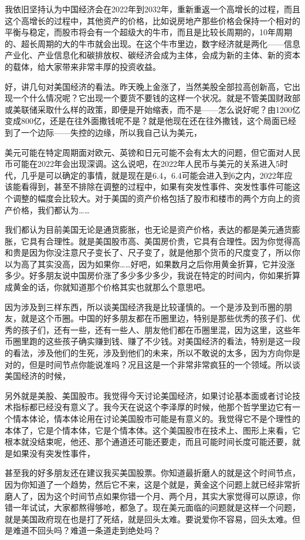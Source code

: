 \documentclass[UTF8, 12pt, a4paper]{ctexrep}
\begin{document}
我依旧坚持认为中国经济会在2022年到2032年，重新重返一个高增长的过程，而且这个高增长的过程中，其他资产的价格，比如说房地产那些价格会保持一个相对的平衡与稳定，而股市将会有一个超级大的牛市，而且是比较长周期的，10年周期的、超长周期的大的牛市就会出现。在这个牛市里边，数字经济就是两化——信息产业化、产业信息化和碳排放权、碳经济会成为主体，会成为新的主体、新的资本的载体，给大家带来非常丰厚的投资收益。

好，讲几句对美国经济的看法。昨天晚上金涨了，当然美股全部拉高创新高，它出现一个什么情况呢？它出现一个要货不要钱的这样一个状况。就是不管美国财政部或美联储采取什么样的政策，即便是开始缩表，而不是——怎么说好呢？由1200亿变成800亿，还是在往外面撒钱呢不是？就是他现在还在往外撒钱，这个局面已经到了一个边际——失控的边缘，所以我自己认为美元，

美元可能在特定周期面对欧元、英镑和日元可能不会有太大的问题，但它面对人民币可能在2022年会出现深调。这么说吧，在2022年人民币与美元的关系进入5时代，几乎是可以确定的事情，就是现在是6.4，6.4可能会进入到6之内，2022年应该能看得到，甚至不排除在调整的过程中，如果有突发性事件、突发性事件可能这个调整的幅度会比较大。对于美国的资产价格包括了股市和楼市的两个方向上的资产价格，我们都认为……

我们都认为目前美国无论是通货膨胀，也无论是资产价格，表达的都是美元通货膨胀，它具有合理性。就是美国股市高、美国房价贵，它具有合理性。因为你觉得高和贵是因为你没注意尺子变长了、尺子变了，就是他那个货币的尺度变了，所以你以为高了其实没高，因为如果你……好吧，如果数月之后你用黄金折算，它并没涨多少。好多朋友说中国房价涨了多少多少多少，我说在特定的时间内，你如果折算成黄金的话，你就知道那个价格其实也就那么个意思吧。

因为涉及到三样东西，所以谈美国经济我是比较谨慎的。一个是涉及到币圈的朋友，就是这个币圈。中国的好多朋友都在币圈里边，特别是那些优秀的孩子们、优秀的孩子们，还有一些，还有一些人、朋友他们都在币圈里混，因为这里，这些年币圈里跑的这些孩子确实赚到钱、赚了不少钱。对美国经济的看法，特别是这一段的看法，涉及他们的生死，涉及到他们的未来，所以不敢说的太多，因为方向你是对的，但是时间节点你能说准吗？况且这是一个非常非常疯狂的一个领域。所以谈美国经济的时候，

另外就是美股、美国股市。我觉得今天讨论美国经济，如果讨论基本面或者讨论技术指标都已经没有意义了。我今天在说这个李泽厚的时候，他那个哲学里边它有一个情本体论，情本体论用在讨论美国股市可能是有意义的。我觉得它不是个理性的本体了，它是个情本体，它是个情本体。这个美国股市在技术上、图形上来看，它根本就没结束呢，他还、那个通道还可能还要走，而且可能时间长度可能还要，就是如果没有突发性事件，

甚至我的好多朋友还在建议我买美国股票。你知道最折磨人的就是这个时间节点，因为你知道了一个趋势，然后它不来，这是个就是，黄金这个问题上就已经非常折磨人了，因为这个时间节点如果你错一个月、两个月，其实大家觉得可以原谅，你错一年试试，大家都熬得够呛，都急了。现在美元面临的问题就是这样一个问题，就是美国政府现在也是打了死结，就是回头太难。要说爱你不容易，回头太难。但是难道不回头吗？难道一条道走到绝处吗？
\end{document}
